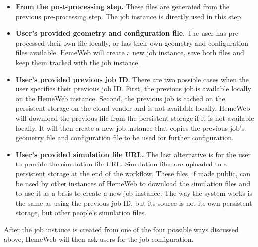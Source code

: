 \begin{itemize}
    \item \textbf{From the post-processing step.}
    	These files are generated from the previous pre-processing step. The job instance is directly used in this step.
    
    \item \textbf{User's provided geometry and configuration file.}
    	The user has pre-processed their own file locally, or has their own geometry and configuration files available. HemeWeb will create a new job instance, save both files and keep them tracked with the job instance.
	
    \item \textbf{User's provided previous job ID.}
    	There are two possible cases when the user specifies their previous job ID. First, the previous job is available locally on the HemeWeb instance. Second, the previous job is cached on the persistent storage on the cloud vendor and is not available locally. HemeWeb will download the previous file from the persistent storage if it is not available locally. It will then create a new job instance that copies the previous job's geometry file and configuration file to be used for further configuration.
    
    \item \textbf{User's provided simulation file URL.}
    	The last alternative is for the user to provide the simulation file URL. Simulation files are uploaded to a persistent storage at the end of the workflow. These files, if made public, can be used by other instances of HemeWeb to download the simulation files and to use it as a basis to create a new job instance. The way the system works is the same as using the previous job ID, but its source is not its own persistent storage, but other people's simulation files.

\end{itemize}


After the job instance is created from one of the four possible ways discussed above, HemeWeb will then ask users for the job configuration. 

\vspace{1cm}

